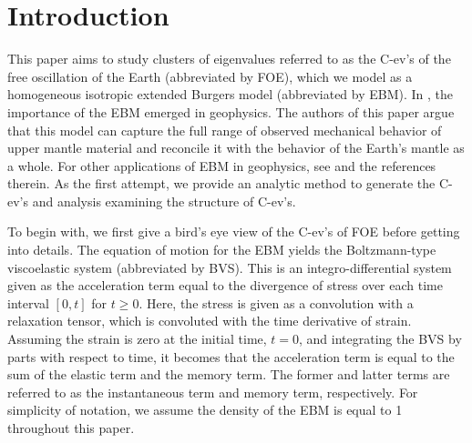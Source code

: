 \documentclass[a4paper,12pt]{article}
\newtheorem{a priori condition}[Th]{A priori condition}
\renewcommand{\thesection}{{{\normalsize\arabic{section}}}}
\renewcommand{\theequation}{{{\thesection.\arabic{equation}}}}
\begin{document}
\renewcommand{\theequation}{\thesection.\arabic{equation}}

\section{Introduction}\label{introduction}
\label{sec1}
\setcounter{equation}{0}
This paper aims to study clusters of eigenvalues referred to as the C-ev's of the free oscillation of the Earth (abbreviated by FOE), which we model as a homogeneous isotropic extended Burgers model (abbreviated by EBM). In \cite{YP}, the importance of the EBM emerged in geophysics. The authors of this paper argue that this model can capture the full range of observed mechanical behavior of upper mantle material and reconcile it with the behavior of the Earth's mantle as a whole. For other applications of EBM in geophysics, see \cite{Ivins, LauFaul_2019, Harry} and the references therein. As the first attempt, we provide an analytic method to generate the C-ev's and analysis examining the structure of C-ev's.  

To begin with, we first give a bird's eye view of the C-ev's of FOE before getting into details. The equation of motion for the EBM yields the Boltzmann-type viscoelastic system (abbreviated by BVS). This is an integro-differential system given as the acceleration term 
equal to the divergence of stress over each time interval $[0,t]$ for $t\ge0$. Here, the stress is given as a convolution with a relaxation tensor, which is convoluted with the time derivative of strain. Assuming the strain is zero at the initial time, $t=0$, and integrating the BVS by parts with respect to time, it becomes that the acceleration term is equal to the sum of the elastic term and the memory term. The former and latter terms are referred to as the instantaneous term and memory term, respectively. For simplicity of notation, we assume the density of the EBM is equal to 1 throughout this paper.
\end{document}
